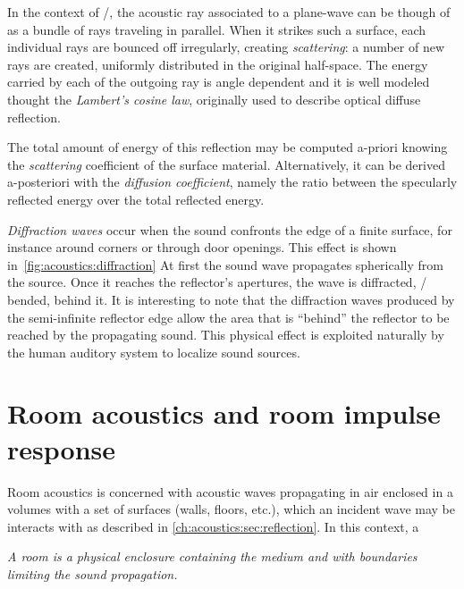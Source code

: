 In the context of \GA/, the acoustic ray associated to a plane-wave can be though of as a bundle of rays traveling in parallel.
When it strikes such a surface, each individual rays are bounced off irregularly, creating \textit{scattering}:
a number of new rays are created, uniformly distributed in the original half-space.
The energy carried by each of the outgoing ray is angle dependent and it
is well modeled thought the \textit{Lambert's cosine law}, originally used to describe optical diffuse reflection.

The total amount of energy of this reflection may be computed a-priori
knowing the \textit{scattering} coefficient of the surface material.
Alternatively, it can be derived a-posteriori with the \textit{diffusion coefficient}, namely the ratio between
the specularly reflected energy over the total reflected energy.

\textit{Diffraction waves} occur when the sound confronts the edge of a finite surface, for instance around corners or through door openings.
This effect is shown in~\cref{fig:acoustics:diffraction}
At first the sound wave propagates spherically from the source.
Once it reaches the reflector's  apertures, the wave is diffracted, \ie/ bended, behind it.
It is interesting to note that the diffraction waves produced by the semi-infinite reflector edge
allow the area that is ``behind'' the reflector to be reached by the propagating sound.
This physical effect is exploited naturally by the human auditory system to localize sound sources.

\section{Room acoustics and room impulse response}\label{ch:acoustics:sec:rir}
Room acoustics is concerned with acoustic waves propagating in air enclosed in a volumes with a set of surfaces
(walls, floors, etc.), which an incident wave may be interacts with as described in \cref{ch:acoustics:sec:reflection}.
In this context, a
\begin{center}
    \textit{A room is a physical enclosure containing the medium and with boundaries limiting the sound propagation.}
\end{center}

